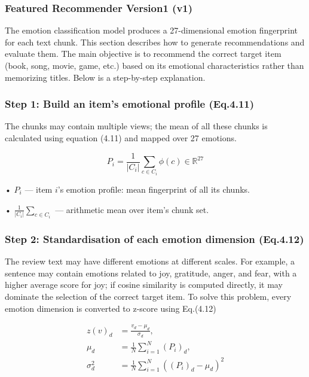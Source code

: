 \subsubsection{Featured Recommender Version1 (v1)}
The emotion classification model produces a 27-dimensional emotion fingerprint for each text chunk. This section describes how to generate recommendations and evaluate them. The main objective is to recommend the correct target item (book, song, movie, game, etc.) based on its emotional characteristics rather than memorizing titles. Below is a step-by-step explanation.

\subsubsection{Step 1: Build an item’s emotional profile (Eq.4.11)}
The chunks may contain multiple views; the mean of all these chunks is calculated using equation (4.11) and mapped over 27 emotions.

\begin{equation}
  P_{i} = \frac{1}{|C_{i}|} \sum_{c \in C_{i}} \phi(c) \in \mathbb{R}^{27}
  \label{eq:ch4_4_11}
\end{equation}

• $P_i$ --- item $i$'s emotion profile: mean fingerprint of all its chunks.

• $\frac{1}{|C_i|} \sum_{c \in C_i}$ --- arithmetic mean over item's chunk set.

\subsubsection{Step 2: Standardisation of  each emotion dimension (Eq.4.12)}
The review text may have different emotions at different scales. For example, a sentence may contain emotions related to joy, gratitude, anger, and fear, with a higher average score for joy; if cosine similarity is computed directly, it may dominate the selection of the correct target item. To solve this problem, every emotion dimension is converted to z-score using Eq.(4.12)

\begin{equation}
  \begin{aligned}
  z(v)_{d} &= \frac{v_{d} - \mu_{d}}{\sigma_{d}}, \\
  \mu_{d} &= \frac{1}{N} \sum_{i=1}^{N} (P_{i})_{d}, \\
  \sigma_{d}^{2} &= \frac{1}{N} \sum_{i=1}^{N} \left( (P_{i})_{d} - \mu_{d} \right)^{2}
  \end{aligned}
  \label{eq:ch4_4_12}
\end{equation}

